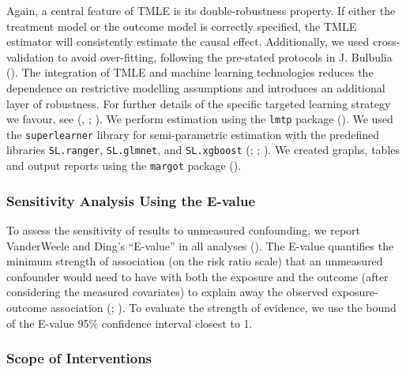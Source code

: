 \documentclass[
  single column]{article}
\begin{document}
Again, a central feature of TMLE is its double-robustness property. If
either the treatment model or the outcome model is correctly specified,
the TMLE estimator will consistently estimate the causal effect.
Additionally, we used cross-validation to avoid over-fitting, following
the pre-stated protocols in J. Bulbulia
(). The integration of TMLE
and machine learning technologies reduces the dependence on restrictive
modelling assumptions and introduces an additional layer of robustness.
For further details of the specific targeted learning strategy we
favour, see (,
; ). We perform estimation using the \texttt{lmtp} package
(). We used the
\texttt{superlearner} library for semi-parametric estimation with the
predefined libraries \texttt{SL.ranger}, \texttt{SL.glmnet}, and
\texttt{SL.xgboost} (;
;
). We created graphs,
tables and output reports using the \texttt{margot} package
().

\subsubsection{Sensitivity Analysis Using the
E-value}\label{sensitivity-analysis-using-the-e-value}

To assess the sensitivity of results to unmeasured confounding, we
report VanderWeele and Ding's ``E-value'' in all analyses
().
The E-value quantifies the minimum strength of association (on the risk
ratio scale) that an unmeasured confounder would need to have with both
the exposure and the outcome (after considering the measured covariates)
to explain away the observed exposure-outcome association
(; ). To evaluate the strength of evidence, we use the bound of the
E-value 95\% confidence interval closest to 1.

\subsubsection{Scope of Interventions}\label{scope-of-interventions}
\end{document}
